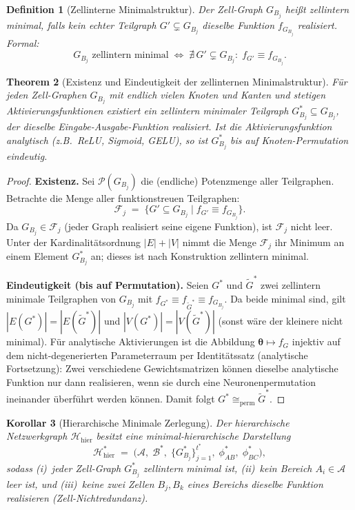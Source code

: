 \documentclass[12pt, a4paper, openany]{report}
\newtheorem{theorem}{Theorem}[chapter]
\newtheorem{corollary}[theorem]{Korollar}
\newtheorem{definition}[theorem]{Definition}
\newcommand{\calH}{\mathcal{H}}
\newcommand{\calA}{\mathcal{A}}
\newcommand{\calB}{\mathcal{B}}
\newcommand{\calF}{\mathcal{F}}
\newcommand{\calP}{\mathcal{P}}
\begin{document}
\begin{definition}[Zellinterne Minimalstruktur]
\label{def:cell_minimal}
Der Zell-Graph $G_{B_j}$ heißt \emph{zellintern minimal}, falls kein echter
Teilgraph $G' \subsetneq G_{B_j}$ dieselbe Funktion $f_{G_{B_j}}$ realisiert.
Formal:
\[
  G_{B_j} \text{ zellintern minimal}
  \;\Leftrightarrow\;
  \nexists\, G' \subsetneq G_{B_j}:\;
  f_{G'} \equiv f_{G_{B_j}}.
\]
\end{definition}

\begin{theorem}[Existenz und Eindeutigkeit der zellinternen Minimalstruktur]
\label{thm:cell_minimal_existence}
Für jeden Zell-Graphen $G_{B_j}$ mit endlich vielen Knoten und Kanten und
stetigen Aktivierungsfunktionen existiert ein zellintern minimaler Teilgraph
$G^*_{B_j} \subseteq G_{B_j}$, der dieselbe Eingabe-Ausgabe-Funktion
realisiert.  Ist die Aktivierungsfunktion analytisch (z.B.\ ReLU, Sigmoid,
GELU), so ist $G^*_{B_j}$ bis auf Knoten-Permutation eindeutig.
\end{theorem}

\begin{proof}
\textbf{Existenz.}
Sei $\calP(G_{B_j})$ die (endliche) Potenzmenge aller Teilgraphen.
Betrachte die Menge aller funktionstreuen Teilgraphen:
\[
  \calF_j \;=\; \bigl\{G' \subseteq G_{B_j} \;\big|\; f_{G'} \equiv f_{G_{B_j}}\bigr\}.
\]
Da $G_{B_j} \in \calF_j$ (jeder Graph realisiert seine eigene Funktion), ist
$\calF_j$ nicht leer.  Unter der Kardinalitätsordnung $|E| + |V|$ nimmt die
Menge $\calF_j$ ihr Minimum an einem Element $G^*_{B_j}$ an; dieses ist nach
Konstruktion zellintern minimal.

\textbf{Eindeutigkeit (bis auf Permutation).}
Seien $G^*$ und $\tilde{G}^*$ zwei zellintern minimale Teilgraphen von
$G_{B_j}$ mit $f_{G^*} \equiv f_{\tilde{G}^*} \equiv f_{G_{B_j}}$.  Da beide
minimal sind, gilt $|E(G^*)| = |E(\tilde{G}^*)|$ und $|V(G^*)| = |V(\tilde{G}^*)|$
(sonst wäre der kleinere nicht minimal).
Für analytische Aktivierungen ist die Abbildung $\bm{\theta} \mapsto f_G$
injektiv auf dem nicht-degenerierten Parameterraum per Identitätssatz
(analytische Fortsetzung): Zwei verschiedene Gewichtsmatrizen können
dieselbe analytische Funktion nur dann realisieren, wenn sie durch eine
Neuronenpermutation ineinander überführt werden können.  Damit folgt
$G^* \cong_{\mathrm{perm}} \tilde{G}^*$.
\end{proof}

\begin{corollary}[Hierarchische Minimale Zerlegung]
\label{cor:hierarchical_decomposition}
Der hierarchische Netzwerkgraph $\calH_{\mathrm{hier}}$ besitzt eine
\emph{minimal-hierarchische Darstellung}
\[
  \calH^*_{\mathrm{hier}}
  \;=\;
  \bigl(\calA,\; \calB^*,\; \{G^*_{B_j}\}_{j=1}^{t^*},\;
        \phi^*_{AB},\; \phi^*_{BC}\bigr),
\]
sodass (i)~jeder Zell-Graph $G^*_{B_j}$ zellintern minimal ist,
(ii)~kein Bereich $A_i \in \calA$ leer ist, und (iii)~keine zwei
Zellen $B_j, B_k$ eines Bereichs dieselbe Funktion realisieren
(Zell-Nichtredundanz).
\end{corollary}
\end{document}
